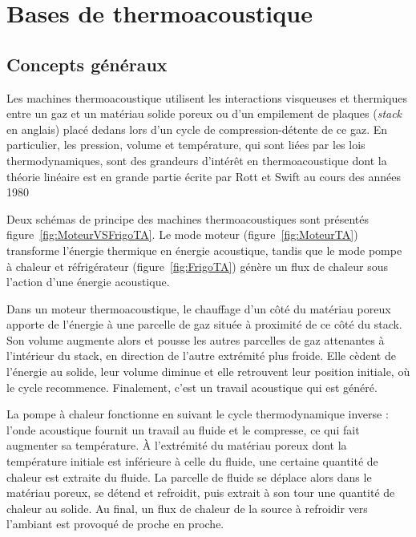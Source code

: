 \section{Bases de thermoacoustique}
\subsection{Concepts généraux}
Les machines thermoacoustique utilisent les interactions visqueuses et thermiques entre un gaz et un matériau solide poreux ou d’un empilement de plaques (\textit{stack} en anglais) placé dedans lors d’un cycle de compression-détente de ce gaz. En particulier, les pression, volume et température, qui sont liées par les lois thermodynamiques, sont des grandeurs d’intérêt en thermoacoustique dont la théorie linéaire est en grande partie écrite par Rott et Swift au cours des années 1980 \cite{rott_damped_1969, rott_thermally_1973, rott_thermally_1975, rott_thermally_1976, zouzoulas_thermally_1976, rott_thermoacoustics_1980, muller_thermally_1983}

Deux schémas de principe des machines thermoacoustiques sont présentés figure~\ref{fig:MoteurVSFrigoTA}. Le mode moteur (figure~\ref{fig:MoteurTA}) transforme l’énergie thermique en énergie acoustique, tandis que le mode pompe à chaleur et réfrigérateur (figure~\ref{fig:FrigoTA}) génère un flux de chaleur sous l'action d'une énergie acoustique. 

Dans un moteur thermoacoustique, le chauffage d'un côté du matériau poreux apporte de l'énergie à une parcelle de gaz située à proximité de ce côté du stack. Son volume augmente alors et pousse les autres parcelles de gaz attenantes à l'intérieur du stack, en direction de l'autre extrémité plus froide. Elle cèdent de l'énergie au solide, leur volume diminue et elle retrouvent leur position initiale, où le cycle recommence. Finalement, c'est un travail acoustique qui est généré.

La pompe à chaleur fonctionne en suivant le cycle thermodynamique inverse : l'onde acoustique fournit un travail au fluide et le compresse, ce qui fait augmenter sa température. À l'extrémité du matériau poreux dont la température initiale est inférieure à celle du fluide, une certaine quantité de chaleur est extraite du fluide. La parcelle de fluide se déplace alors dans le matériau poreux, se détend et refroidit, puis extrait à son tour une quantité de chaleur au solide. Au final, un flux de chaleur de la source à refroidir vers l'ambiant est provoqué de proche en proche.\smallskip

